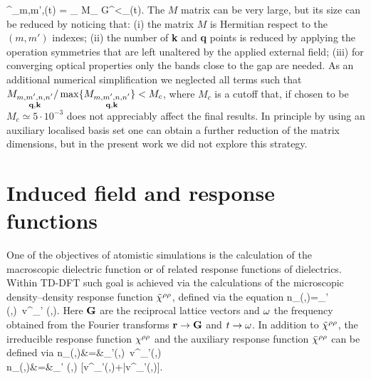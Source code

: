 \be
\Sigma^{}_{m,m',\kk}(t) = \sum_{} M_{} \cdot G^<_{}(t).
\ee
The $M$ matrix can be very large, but its size can be reduced by noticing that: 
(i) the matrix $M$ is Hermitian respect to the $(m,m')$ indexes; 
(ii) the number of {\bf k} and {\bf q} points is reduced by applying the operation symmetries that are left unaltered by the applied external
field; (iii) for converging optical properties only the bands close to the gap are needed.
As an additional numerical simplification we neglected all terms such that $M_{ \substack{m,m',n,n' \\ \mathbf q,{\bf k}}} /\max\{ M_{ \substack{ m,m',n,n'
\\ \mathbf q , {\bf k}}}\}<M_c$, where $M_c$ is a cutoff that, if chosen to be $M_c \simeq 5\cdot 10^{-3}$  does not appreciably affect the final results. In principle by using an auxiliary localised basis set\cite{schwegler:9708,faber2014excited} one can obtain a further reduction of the matrix dimensions, but in the present work we did not explore this strategy.



\chapter{Induced field and response functions} \label{appA}

One of the objectives of atomistic simulations is the calculation of
the macroscopic dielectric function or of related response functions of dielectrics.
Within TD-DFT such goal is achieved via the calculations of the
microscopic density--density response function $\tilde\chi^{\rho\rho}$, defined via the equation
\be
\delta n_{\sss \GG}(\qq,\w)=\tchirr_{\sss \GG\GG'} (\qq,\w)\ \delta v^{}_{\sss \GG'} (\qq,\w).
\label{eq:chi_red} 
\ee
Here ${\bf G}$ are the reciprocal lattice vectors and $\omega$
the frequency obtained from the Fourier transforms ${\bf r}\rightarrow{\bf G}$ and $t\rightarrow\omega$.
In addition to  $\tilde\chi^{\rho\rho}$, 
 the irreducible response function $\chi^{\rho\rho}$ and
 the auxiliary response function $\bar\chi^{\rho\rho}$ can be defined via
 \bea
 \delta n_{\sss \GG}(\qq,\w)&=&\chirr_{\sss \GG\GG'}(\qq,\w)\
  \delta v^{}_{\sss \GG'}(\qq,\w) \label{eq:chi_irr} \\
  \delta n_{\sss \GG}(\qq,\w)&=&\bchirr_{\sss \GG\GG'} (\qq,\w)
   [\delta v^{}_{\sss \GG'}(\qq,\w)+\delta \bar v^_{\sss \GG'}(\qq,\w)]. \label{eq:chi_bar}
   \eea

